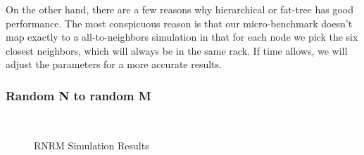 On the other hand, there are a few reasons why hierarchical or fat-tree has good performance. The most conspicuous reason is that our micro-benchmark doesn't map exactly to a all-to-neighbors simulation in that for each node we pick the six closest neighbors, which will always be in the same rack. If time allows, we will adjust the parameters for a more accurate results.

\subsubsection{Random N to random M}

\captionsetup[subfloat]{captionskip=-0.003in}
\begin{figure}
    \centering
    \\
    \vspace{-0.1in}
    \vspace{-0.07in}
    \caption{RNRM Simulation Results}
    \vspace{-0.1in}
\end{figure}



